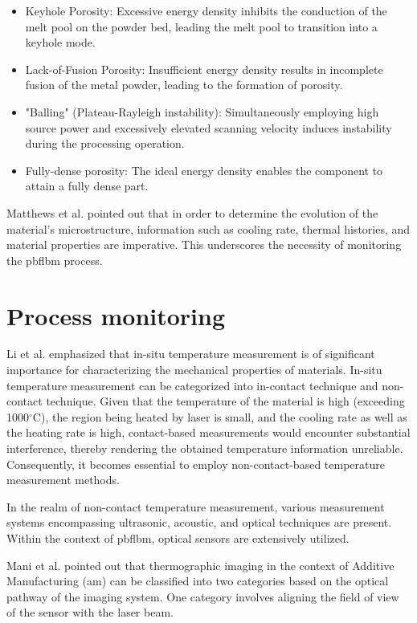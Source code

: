\begin{itemize}
    \item Keyhole Porosity: Excessive energy density inhibits the conduction 
    of the melt pool on the powder bed, leading the melt pool to transition 
    into a keyhole mode.
    \item Lack-of-Fusion Porosity: Insufficient energy density results in 
    incomplete fusion of the metal powder, leading to the formation of 
    porosity.
    \item "Balling" (Plateau-Rayleigh instability): Simultaneously employing 
    high source power and excessively elevated scanning velocity induces 
    instability during the processing operation.
    \item Fully-dense porosity: The ideal energy density enables the 
    component to attain a fully dense part.
\end{itemize}


Matthews et al. \cite{Matthews.2017} pointed out that in order to determine 
the evolution of the material's microstructure, information such as 
cooling rate, thermal histories, and material properties are imperative. 
This underscores the necessity of monitoring the \gls{pbflbm} process.

\section{Process monitoring}%
Li et al. \cite{Li.2019} emphasized that in-situ temperature measurement is 
of significant importance for characterizing the mechanical properties of 
materials. In-situ temperature measurement can be categorized into 
in-contact technique and non-contact technique. Given that the temperature 
of the material is high (exceeding 1000$^\circ$C), the region being heated by laser 
is small, and the cooling rate as well as the heating rate is high, 
contact-based measurements would encounter substantial interference, 
thereby rendering the obtained temperature information unreliable. 
Consequently, it becomes essential to employ non-contact-based 
temperature measurement methods.


In the realm of non-contact temperature measurement, 
various measurement systems encompassing ultrasonic, acoustic, and optical 
techniques are present. Within the context of \gls{pbflbm}, 
optical sensors are extensively utilized\cite{Krauss.2012}.


Mani et al. \cite{Mani.2017} pointed out that thermographic imaging in the 
context of Additive Manufacturing (\gls{am}) can be classified into two 
categories based on the optical pathway of the imaging system. 
One category involves aligning the field of view of the sensor with 
the laser beam\cite{Craeghs.2010b,Craeghs.2012,Chivel.2010,Bammer.2010,Berumen.2010,Lott.2011,Yadroitsev.2014}. 

